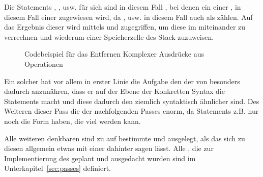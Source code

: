 Die Statements , , usw. für sich sind in diesem Fall , bei denen ein  einer , in diesem Fall einer  zugewiesen wird, da ,  usw. in diesem Fall auch als   zählen. Auf das Ergebnis dieser  wird mittels  und  zugegriffen, um diese im   miteinander zu verrechnen und wiederum einer Speicherzelle des Stack zuzuweisen.

\begin{figure}[H]
  \hfill

  \caption{Codebeispiel für das Entfernen Komplexer Ausdrücke aus Operationen}
  \label{fig:example_remove_complex_operands}
\end{figure}


Ein solcher  hat vor allem in erster Linie die Aufgabe den  der  von  besonders dadurch anzunähren, dass er auf der Ebene der Konkretten Syntax die Statements  macht und diese dadurch den ziemlich  syntaktisch ähnlicher sind. Des Weiteren  dieser Pass die  der nachfolgenden Passes enorm, da Statements z.B. nur noch die Form  haben, die viel  werden kann.

Alle weiteren denkbaren  sind zu  auf bestimmte  und  ausgelegt, als das sich zu diesen allgemein etwas mit einer  dahinter sagen lässt. Alle , die zur Implementierung des  geplant und ausgedacht wurden sind im Unterkapitel~\ref{sec:passes} definiert.

